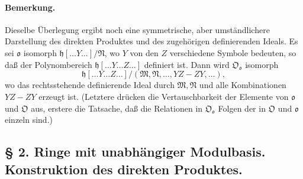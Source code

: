 \paragraph{Bemerkung.}
Dieselbe Überlegung ergibt noch eine symmetrische, aber umständlichere Darstellung des direkten Produktes und des zugehörigen definierenden Ideals. Es sei $\mathfrak o$ isomorph $\mathfrak h[\ldots Y\ldots]/\mathfrak N$, wo $Y$ von den $Z$ verschiedene Symbole bedeuten, so daß der Polynombereich $\mathfrak h[\ldots Y\ldots Z\ldots]$ definiert ist. Dann wird $\mathfrak O_{\mathfrak o}$ isomorph
\[
\mathfrak h[\ldots Y\ldots Z\ldots]/(\mathfrak M,\mathfrak N,\ldots,YZ-ZY,\ldots),
\]
wo das rechtsstehende definierende Ideal durch $\mathfrak M,\mathfrak N$ und alle Kombinationen $YZ-ZY$ erzeugt ist. (Letztere drücken die Vertauschbarkeit der Elemente von $\mathfrak o$ und $\mathfrak O$ aus, erstere die Tatsache, daß die Relationen in $\mathfrak O_{\mathfrak o}$ Folgen der in $\mathfrak O$ und $\mathfrak o$ einzeln sind.)
\subsection*{§ 2. Ringe mit unabhängiger Modulbasis. Konstruktion des direkten Produktes.}

